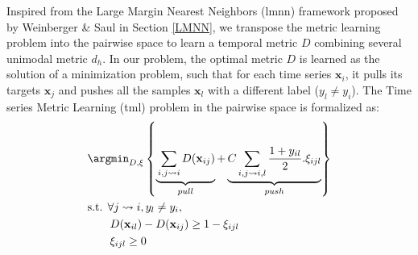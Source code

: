 Inspired from the Large Margin Nearest Neighbors ({\sc lmnn}) framework proposed by Weinberger \& Saul in Section \ref{LMNN}, we transpose the metric learning problem into the pairwise space to learn a temporal metric $D$ combining several unimodal metric $d_h$. In our problem, the optimal metric $D$ is learned as the solution of a minimization problem, such that for each time series $\textbf{x}_i$, it pulls its targets $\textbf{x}_j$ and pushes all the samples $\textbf{x}_l$ with a different label ($y_l \neq y_i$). The Time series Metric Learning ({\sc tml}) problem in the pairwise space is formalized as:
\begin{align}
	&\displaystyle 		\argmin_{D,\xi} \left\lbrace \underbrace{
		\vphantom{ \sum\limits_{i,j \rightsquigarrow i,l} \frac{1+y_{il}}{2}.\xi_{ijl} }
		\sum_{i,j\rightsquigarrow i}D(\textbf{x}_{ij})
	}_{pull}
	+
	\underbrace{
		C\sum\limits_{i,j \rightsquigarrow i,l} \frac{1+y_{il}}{2}.\xi_{ijl}
	}
	_{push} \right\rbrace  \label{eq:OriginalOptimizationProblem_Objective} \\
	&\text{s.t.  } \forall j \rightsquigarrow i, y_l\neq y_i, \nonumber \\
	& \qquad D(\textbf{x}_{il})-D(\textbf{x}_{ij}) \geq 1-\xi_{ijl} \label{eq:OriginalOptimizationProblem2}\\
	& \qquad \xi_{ijl} \geq 0 
	\label{eq:OriginalOptimizationProblem} 
\end{align}

